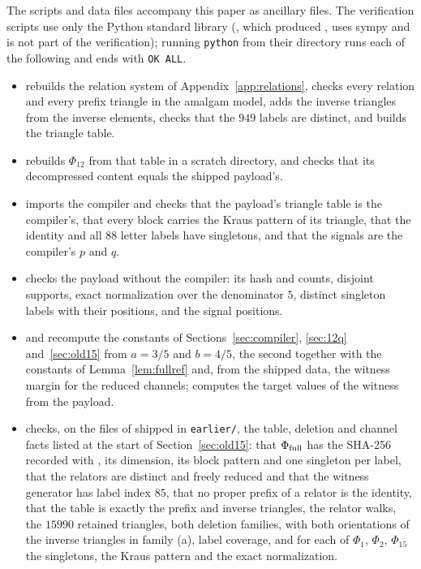 \documentclass[11pt]{article}
\begin{document}
The scripts and data files accompany this paper as ancillary files.  The verification scripts use only the Python standard library (, which produced , uses sympy and is not part of the verification); running \texttt{python}  from their directory runs each of the following and ends with \texttt{OK ALL}.
\begin{itemize}
\item {} rebuilds the relation system of Appendix~\ref{app:relations}, checks every relation and every prefix triangle in the amalgam model, adds the inverse triangles from the inverse elements, checks that the $949$ labels are distinct, and builds the triangle table.
\item {} rebuilds $\Phi_{12}$ from that table in a scratch directory, and  checks that its decompressed content equals the shipped payload's.
\item {} imports the compiler and checks that the payload's triangle table is the compiler's, that every block carries the Kraus pattern of its triangle, that the identity and all $88$ letter labels have singletons, and that the signals are the compiler's $p$ and $q$.
\item {} checks the payload without the compiler: its hash and counts, disjoint supports, exact normalization over the denominator $5$, distinct singleton labels with their positions, and the signal positions.
\item {} and  recompute the constants of Sections~\ref{sec:compiler}, \ref{sec:12q} and~\ref{sec:old15} from $a=3/5$ and $b=4/5$, the second together with the constants of Lemma~\ref{lem:fullref} and, from the shipped data, the witness margin for the reduced channels;  computes the target values of the witness from the payload.
\item {} checks, on the files of \cite{MghirbiDouglasV1} shipped in \texttt{earlier/}, the table, deletion and channel facts listed at the start of Section~\ref{sec:old15}: that $\Phi_{\rm full}$ has the SHA-256 recorded with \cite{MghirbiDouglasV1}, its dimension, its block pattern and one singleton per label, that the relators are distinct and freely reduced and that the witness generator has label index $85$, that no proper prefix of a relator is the identity, that the table is exactly the prefix and inverse triangles, the relator walks, the $15990$ retained triangles, both deletion families, with both orientations of the inverse triangles in family (a), label coverage, and for each of $\Phi_1$, $\Phi_2$, $\Phi_{15}$ the singletons, the Kraus pattern and the exact normalization.

\end{itemize}
\end{document}
